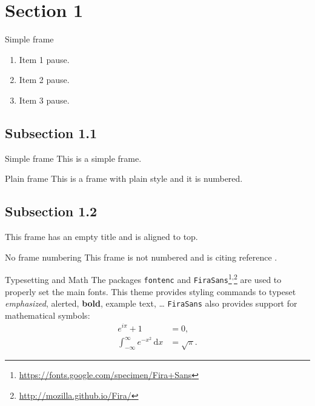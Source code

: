
    \section{Section 1}
    \begin{frame}{Simple frame}
        \begin{enumerate}
            \item Item 1 pause.
            \pause
            \item Item 2 pause.
            \pause
            \item Item 3 pause.
        \end{enumerate}
    \end{frame}
    \begin{frame}

    \end{frame}
    \subsection{Subsection 1.1}

    \begin{frame}{Simple frame}
        This is a simple frame.
    \end{frame}
    
    \begin{frame}{Plain frame}
        This is a frame with plain style and it is numbered.
    \end{frame}
    \subsection{Subsection 1.2}
    \begin{frame}
        This frame has an empty title and is aligned to top.
    \end{frame}
    
    \begin{frame}{No frame numbering}
        This frame is not numbered and is citing reference \cite{knuth74}.
    \end{frame}
    
    \begin{frame}{Typesetting and Math}
        The packages \texttt{fontenc} and \texttt{FiraSans}\footnote{\url{https://fonts.google.com/specimen/Fira+Sans}}\textsuperscript{,}\footnote{\url{http://mozilla.github.io/Fira/}} are used to properly set the main fonts.
        \vfill
        This theme provides styling commands to typeset \emph{emphasized}, \alert{alerted}, \textbf{bold}, \textcolor{example}{example text}, \dots
        \vfill
        \texttt{FiraSans} also provides support for mathematical symbols:
        \begin{align*}
            e^{i\pi} + 1 & = 0, \\
            \int_{-\infty}^\infty e^{-x^2}\,\mathrm{d}x & = \sqrt{\pi}.
        \end{align*}
    \end{frame}

